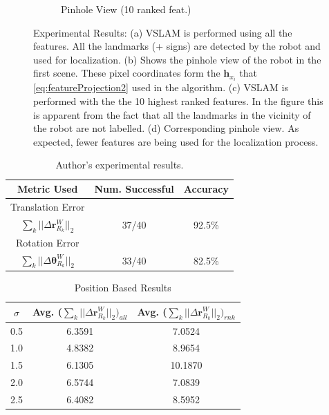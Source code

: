\documentclass[10pt,twocolumn,letterpaper]{article}
\begin{document}
\begin{figure}[t!]
\begin{subfigure}[b]{0.25\textwidth}
                \caption{Pinhole View (10 ranked feat.)}
                \label{fig:mouse}
        \end{subfigure}
        \caption{Experimental Results: (a) VSLAM is performed using all the features. All the landmarks (+ signs) are detected by the robot and used for localization. (b) Shows the pinhole view of the robot in the first scene. These pixel coordinates form the $\boldsymbol{h}_{x_i}$ that \eqref{eq:featureProjection2} used in the algorithm. (c) VSLAM is performed with the the 10 highest ranked features. In the figure this is apparent from the fact that all the landmarks in the vicinity of the robot are not labelled. (d) Corresponding pinhole view. As expected, fewer features are being used for the localization process.}
\label{fig:animals}
\end{figure}
\begin{table}[h]
\begin{center}
\begin{tabular}{|c|c|c|}
\hline
Metric Used & Num. Successful & Accuracy  \\
\hline
 Translation Error &   &   \\
$ \sum_k || \Delta \boldsymbol{r}_{R_k}^W ||_2 $ & 37/40 & 92.5\% \\ 
\hline
Rotation Error &   &   \\
$ \sum_k || \Delta \boldsymbol{\theta}_{R_k}^W ||_2 $ & 33/40 & 82.5\% \\
\hline
\end{tabular}
\end{center}
\caption{Author's experimental results.}
\end{table}
\begin{table}[h]
\begin{center}
\begin{tabular}{|c|c|c|}
\hline
$\sigma$ & Avg. ($ \sum_k || \Delta \boldsymbol{r}_{R_k}^W ||_2)_{all} $ & Avg. ($ \sum_k || \Delta \boldsymbol{r}_{R_k}^W ||_2)_{rnk} $ \\
\hline
0.5  & 6.3591  &  7.0524\\
\hline
1.0  &  4.8382 &  8.9654\\
\hline
1.5  &  6.1305 &  10.1870\\
\hline
2.0  &  6.5744 &  7.0839\\
\hline
2.5  &  6.4082 &  8.5952\\
\hline
\end{tabular}
\end{center}
\caption{Position Based Results}
\end{table}
\end{document}
